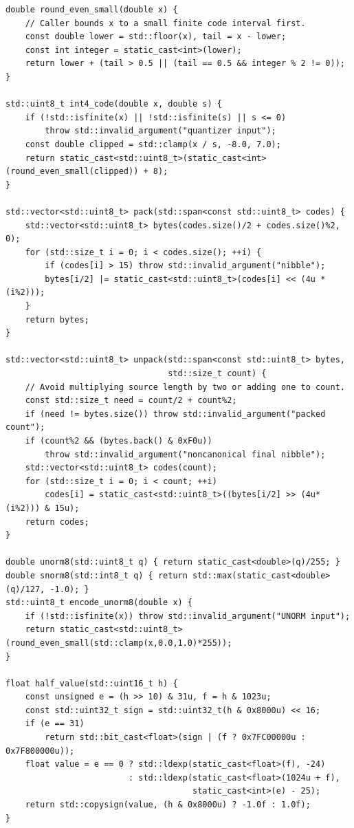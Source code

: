 \begin{verbatim}
double round_even_small(double x) {
    // Caller bounds x to a small finite code interval first.
    const double lower = std::floor(x), tail = x - lower;
    const int integer = static_cast<int>(lower);
    return lower + (tail > 0.5 || (tail == 0.5 && integer % 2 != 0));
}

std::uint8_t int4_code(double x, double s) {
    if (!std::isfinite(x) || !std::isfinite(s) || s <= 0)
        throw std::invalid_argument("quantizer input");
    const double clipped = std::clamp(x / s, -8.0, 7.0);
    return static_cast<std::uint8_t>(static_cast<int>(round_even_small(clipped)) + 8);
}

std::vector<std::uint8_t> pack(std::span<const std::uint8_t> codes) {
    std::vector<std::uint8_t> bytes(codes.size()/2 + codes.size()%2, 0);
    for (std::size_t i = 0; i < codes.size(); ++i) {
        if (codes[i] > 15) throw std::invalid_argument("nibble");
        bytes[i/2] |= static_cast<std::uint8_t>(codes[i] << (4u * (i%2)));
    }
    return bytes;
}

std::vector<std::uint8_t> unpack(std::span<const std::uint8_t> bytes,
                                 std::size_t count) {
    // Avoid multiplying source length by two or adding one to count.
    const std::size_t need = count/2 + count%2;
    if (need != bytes.size()) throw std::invalid_argument("packed count");
    if (count%2 && (bytes.back() & 0xF0u))
        throw std::invalid_argument("noncanonical final nibble");
    std::vector<std::uint8_t> codes(count);
    for (std::size_t i = 0; i < count; ++i)
        codes[i] = static_cast<std::uint8_t>((bytes[i/2] >> (4u*(i%2))) & 15u);
    return codes;
}

double unorm8(std::uint8_t q) { return static_cast<double>(q)/255; }
double snorm8(std::int8_t q) { return std::max(static_cast<double>(q)/127, -1.0); }
std::uint8_t encode_unorm8(double x) {
    if (!std::isfinite(x)) throw std::invalid_argument("UNORM input");
    return static_cast<std::uint8_t>(round_even_small(std::clamp(x,0.0,1.0)*255));
}

float half_value(std::uint16_t h) {
    const unsigned e = (h >> 10) & 31u, f = h & 1023u;
    const std::uint32_t sign = std::uint32_t(h & 0x8000u) << 16;
    if (e == 31)
        return std::bit_cast<float>(sign | (f ? 0x7FC00000u : 0x7F800000u));
    float value = e == 0 ? std::ldexp(static_cast<float>(f), -24)
                         : std::ldexp(static_cast<float>(1024u + f),
                                      static_cast<int>(e) - 25);
    return std::copysign(value, (h & 0x8000u) ? -1.0f : 1.0f);
}


\end{verbatim}
